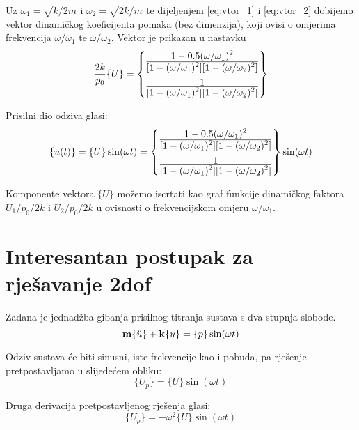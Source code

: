 Uz $\omega_1=\sqrt{k/2m}$ i $\omega_2=\sqrt{2k/m}$ te dijeljenjem \eqref{eq:vtor_1} i \eqref{eq:vtor_2}
dobijemo vektor dinamičkog koeficijenta pomaka (bez dimenzija), koji ovisi o
omjerima frekvencija $\omega/\omega_1$ te $\omega/\omega_2$. Vektor je prikazan u nastavku
\begin{equation}
    \frac{2k}{p_0}\{U\}
    =
    \begin{Bmatrix}
        \frac{\displaystyle 1-0.5(\omega/\omega_1)^2}{\displaystyle [1-(\omega/\omega_1)^2][1-(\omega/\omega_2)^2]}\\[12pt]
        \frac{\displaystyle 1}{\displaystyle [1-(\omega/\omega_1)^2][1-(\omega/\omega_2)^2]}
    \end{Bmatrix}
\end{equation}

Prisilni dio odziva glasi:
\begin{equation}
    \{u(t)\} = \{U\}\sin(\omega t) = 
    \begin{Bmatrix}
        \frac{\displaystyle 1-0.5(\omega/\omega_1)^2}{\displaystyle [1-(\omega/\omega_1)^2][1-(\omega/\omega_2)^2]}\\[12pt]
        \frac{\displaystyle 1}{\displaystyle [1-(\omega/\omega_1)^2][1-(\omega/\omega_2)^2]}
    \end{Bmatrix}
    \sin(\omega t)
\end{equation}

Komponente vektora $\{U\}$ možemo iscrtati kao graf funkcije dinamičkog faktora
$U_1/p_0/2k$ i $U_2/p_0/2k$ u ovisnosti o frekvencijskom omjeru $\omega/\omega_1$.

\section{Interesantan postupak za rješavanje 2dof}
Zadana je jednadžba gibanja prisilnog titranja sustava s dva stupnja slobode.
\begin{equation}\label{eq:jdn_gibanja_osnovno}
    \mathbf{m}\{\ddot{u}\}+\mathbf{k}\{u\}=\{p\}\sin(\omega t)
\end{equation}

Odziv sustava će biti sinusni, iste frekvencije kao i pobuda, pa rješenje
pretpostavljamo u slijedećem obliku:
\begin{equation}\label{eq:pretpostavljeno}
    \{U_p\}=\{U\}\sin(\omega t)
\end{equation}

Druga derivacija pretpostavljenog rješenja glasi:
\begin{equation}\label{eq:pretpostavljeno_dd}
    \{U_p\}=-\omega^2\{U\}\sin(\omega t)
\end{equation}

